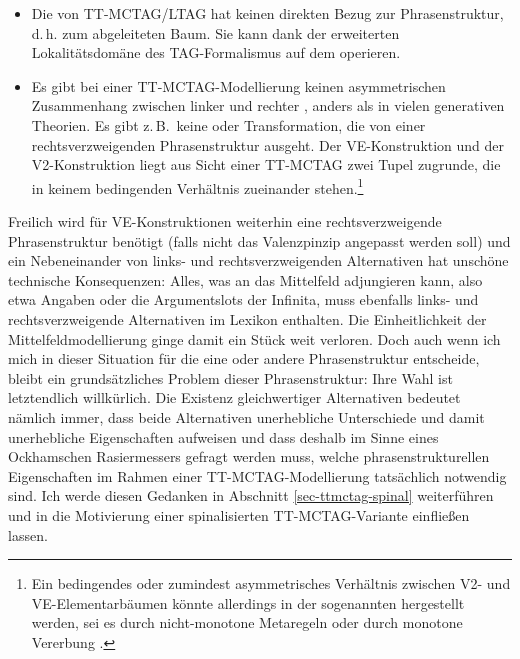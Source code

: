 \begin{itemize}
  \item Die  von TT-MCTAG/LTAG hat keinen direkten Bezug zur Phrasenstruktur, d.\,h. zum abgeleiteten Baum. Sie kann dank der erweiterten Lokalitätsdomäne des TAG-Formalismus auf dem  operieren.
  \item Es gibt bei einer TT-MCTAG-Modellierung keinen asymmetrischen Zusammenhang zwischen linker und rechter , anders als in vielen generativen Theorien. Es gibt z.\,B.\ keine  oder Transformation, die von einer rechtsverzweigenden Phrasenstruktur ausgeht. Der VE-Konstruktion und der V2-Konstruktion liegt aus Sicht einer TT-MCTAG zwei Tupel zugrunde, die in keinem bedingenden Verhältnis zueinander stehen.\footnote{Ein bedingendes oder zumindest asymmetrisches Verhältnis zwischen V2- und VE-Elementarbäumen könnte allerdings in der sogenannten  hergestellt werden, sei es durch nicht-monotone Metaregeln \citep{Becker:94,Becker:00,Prolo:02} oder durch monotone Vererbung \citep{Candito:96,Crabbe:etal:13}.}   
\end{itemize}

Freilich wird für VE-Konstruktionen weiterhin eine rechtsverzweigende Phrasenstruktur benötigt (falls nicht das Valenzpinzip angepasst werden soll) und ein Nebeneinander von links- und rechtsverzweigenden Alternativen hat unschöne technische Konsequenzen: Alles, was an das Mittelfeld adjungieren kann, also etwa Angaben oder die Argumentslots der Infinita, muss ebenfalls links- und rechtsverzweigende Alternativen im Lexikon enthalten. Die Einheitlichkeit der Mittelfeldmodellierung ginge damit ein Stück weit verloren. Doch auch wenn ich mich in dieser Situation für die eine oder andere Phrasenstruktur entscheide, bleibt ein grundsätzliches Problem dieser Phrasenstruktur: Ihre Wahl ist letztendlich willkürlich. Die Existenz gleichwertiger Alternativen bedeutet nämlich immer, dass beide Alternativen unerhebliche Unterschiede und damit unerhebliche Eigenschaften aufweisen und dass deshalb im Sinne eines Ockhamschen Rasiermessers gefragt werden muss, welche phrasenstrukturellen Eigenschaften im Rahmen einer TT-MCTAG-Modellierung tatsächlich notwendig sind. Ich werde diesen Gedanken in Abschnitt \ref{sec-ttmctag-spinal} weiterführen und in die Motivierung einer spinalisierten TT-MCTAG-Variante einflie\ss en lassen.    


